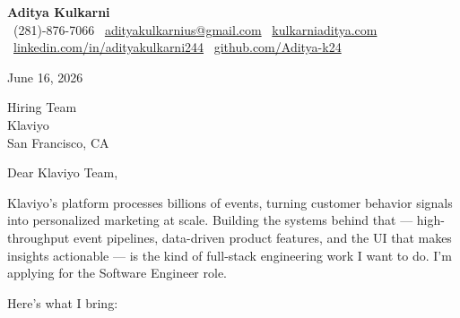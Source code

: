 \documentclass[11pt]{article}
\begin{document}
\begin{center}
  {\LARGE \textbf{Aditya Kulkarni}} \\[4pt]
  \small
  \faPhone\ (281)-876-7066 \quad
  \faEnvelope\ \href{mailto:adityakulkarnius@gmail.com}{adityakulkarnius@gmail.com} \quad
  \faGlobe\ \href{https://www.kulkarniaditya.com}{kulkarniaditya.com} \quad
  \faLinkedin\ \href{https://www.linkedin.com/in/adityakulkarni244/}{linkedin.com/in/adityakulkarni244} \quad
  \faGithub\ \href{https://github.com/Aditya-k24}{github.com/Aditya-k24}
\end{center}

\vspace{6pt}

June 16, 2026

\vspace{6pt}

Hiring Team \\
Klaviyo \\
San Francisco, CA

\vspace{10pt}

Dear Klaviyo Team,

\vspace{6pt}

Klaviyo's platform processes billions of events, turning customer behavior signals into personalized marketing at scale. Building the systems behind that — high-throughput event pipelines, data-driven product features, and the UI that makes insights actionable — is the kind of full-stack engineering work I want to do. I'm applying for the Software Engineer role.

\vspace{8pt}

Here's what I bring:
\end{document}
